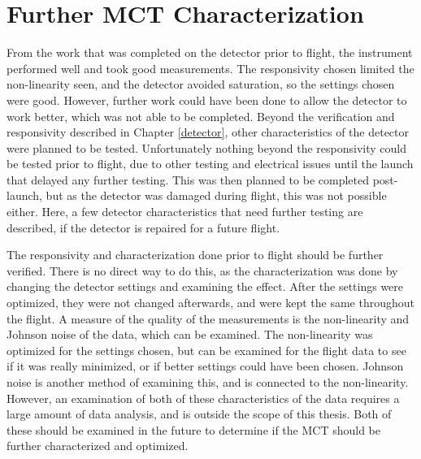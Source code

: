 \section{Further MCT Characterization}
From the work that was completed on the detector prior to flight, the instrument performed well and took good measurements. The responsivity chosen limited the non-linearity seen, and the detector avoided saturation, so the settings chosen were good. However, further work could have been done to allow the detector to work better, which was not able to be completed. Beyond the verification and responsivity described in Chapter \ref{detector}, other characteristics of the detector were planned to be tested. Unfortunately nothing beyond the responsivity could be tested prior to flight, due to other testing and electrical issues until the launch that delayed any further testing. This was then planned to be completed post-launch, but as the detector was damaged during flight, this was not possible either. Here, a few detector characteristics that need further testing are described, if the detector is repaired for a future flight.

The responsivity and characterization done prior to flight should be further verified. There is no direct way to do this, as the characterization was done by changing the detector settings and examining the effect. After the settings were optimized, they were not changed afterwards, and were kept the same throughout the flight. A measure of the quality of the measurements is the non-linearity and Johnson noise of the data, which can be examined. The non-linearity was optimized for the settings chosen, but can be examined for the flight data to see if it was really minimized, or if better settings could have been chosen. Johnson noise is another method of examining this, and is connected to the non-linearity. However, an examination of both of these characteristics of the data requires a large amount of data analysis, and is outside the scope of this thesis. Both of these should be examined in the future to determine if the MCT should be further characterized and optimized.

